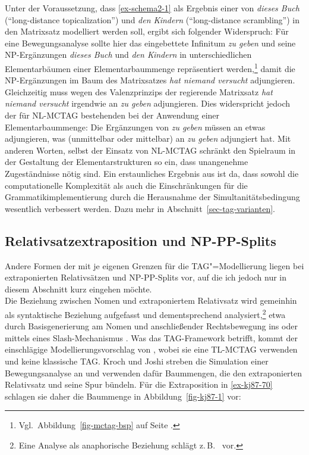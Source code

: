 Unter der Voraussetzung, dass \ref{ex-schema2-1} als Ergebnis einer  von {\it dieses Buch} ("`long-distance topicalization"') und {\it den Kindern} ("`long-distance scrambling"') in den Matrixsatz modelliert werden soll, ergibt sich folgender Widerspruch:
Für eine Bewegungsanalyse sollte hier das eingebettete Infinitum {\it zu geben} und seine NP-Ergänzungen {\it dieses Buch} und {\it den Kindern} in unterschiedlichen Elementarbäumen einer Elementarbaummenge repräsentiert werden,\footnote{Vgl.\ Abbildung~\ref{fig-mctag-bsp} auf Seite \pageref{fig-mctag-bsp}.} damit die NP-Ergänzungen im Baum des Matrixsatzes {\it hat niemand versucht} adjungieren. Gleichzeitig muss wegen des Valenzprinzips der regierende Matrixsatz {\it hat niemand versucht} irgendwie an {\it zu geben} adjungieren. Dies widerspricht jedoch der für NL-MCTAG bestehenden  bei der Anwendung einer Elementarbaummenge: Die Ergänzungen von {\it zu geben} müssen an etwas adjungieren, was (unmittelbar oder mittelbar) an {\it zu geben} adjungiert hat. Mit anderen Worten, selbst der Einsatz von NL-MCTAG schränkt den Spielraum in der Gestaltung der Elementarstrukturen so ein, dass unangenehme Zugeständnisse nötig sind. Ein erstaunliches Ergebnis aus \cite{Rambow:94} ist da, dass sowohl die computationelle Komplexität als auch die Einschränkungen für die Grammatikimplementierung durch die Herausnahme der Simultanitätsbedingung wesentlich verbessert werden. Dazu mehr in Abschnitt~\ref{sec-tag-varianten}.


\subsection{Relativsatzextraposition und NP-PP-Splits} \label{sec-tag-grenzen-wellnest}

Andere Formen der  mit je eigenen Grenzen für die TAG"=Modellierung liegen bei extraponierten Relativsätzen und NP-PP-Splits vor, auf die ich jedoch nur in diesem Abschnitt kurz eingehen möchte. \\

Die Beziehung zwischen Nomen und extraponiertem Relativsatz wird gemeinhin als syntaktische Beziehung aufgefasst und dementsprechend analysiert,\footnote{Eine Analyse als anaphorische Beziehung schlägt z.\,B.\ \cite{Kiss:05} vor.} etwa durch Basisgenerierung am Nomen und anschlie\ss ender Rechtsbewegung ins  \citep{Buering:Hartmann:97} oder mittels eines Slash-Mechanismus \citep{Pollard:Sag:94, Keller:95, Mueller:99}. Was das TAG-Framework betrifft, kommt der einschlägige Modellierungsvorschlag von \cite{Kroch:Joshi:87}, wobei sie eine TL-MCTAG verwenden und keine klassische TAG. Kroch und Joshi streben die Simulation einer Bewegungsanalyse an und verwenden dafür Baummengen, die den extraponierten Relativsatz und seine Spur bündeln. Für die Extraposition in \ref{ex-kj87-70} schlagen sie daher die Baummenge in Abbildung~\ref{fig-kj87-1} vor: 

